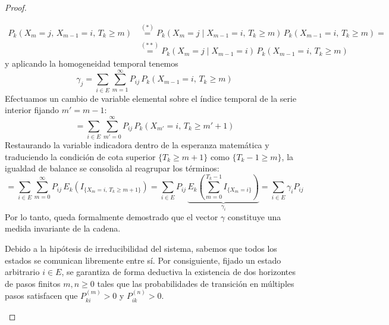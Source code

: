 \begin{teo}
\begin{proof}
\begin{description}
            \begin{align*}
                P_k (X_m = j, \, X_{m-1} = i, \, T_k \geq m) &\overset{(*)}{=} P_k (X_m = j \mid X_{m-1} = i, \, T_k \geq m) \, P_k (X_{m-1} = i, \, T_k \geq m) =\\
                &\overset{(**)}{=} P_k (X_m = j \mid X_{m-1} = i) \, P_k (X_{m-1} = i, \, T_k \geq m)
            \end{align*}
            y aplicando la homogeneidad temporal tenemos
            \[
            \gamma_j=\sum_{i \in E} \sum_{m=1}^{\infty} P_{ij} \, P_k (X_{m-1} = i, \, T_k \geq m)
            \]
            Efectuamos un cambio de variable elemental sobre el índice temporal de la serie interior fijando $m' = m - 1$:
            \[
            = \sum_{i \in E} \sum_{m'=0}^{\infty} P_{ij} \, P_k (X_{m'} = i, \, T_k \geq m' + 1)
            \]
            Restaurando la variable indicadora dentro de la esperanza matemática y traduciendo la condición de cota superior $\{T_k \geq m + 1\}$ como $\{T_k - 1 \geq m\}$, la igualdad de balance se consolida al reagrupar los términos:
            \[
            = \sum_{i \in E} \sum_{m=0}^{\infty} P_{ij} \, E_k \left( I_{\{X_m = i, \, T_k \geq m + 1\}} \right) 
            = \sum_{i \in E} P_{ij} \, \underbrace{E_k \left( \sum_{m=0}^{T_k - 1} I_{\{X_m = i\}} \right)}_{\gamma_i} 
            = \sum_{i \in E} \gamma_i P_{ij}
            \]
            Por lo tanto, queda formalmente demostrado que el vector $\gamma$ constituye una medida invariante de la cadena.
        \item[$(2)$] Debido a la hipótesis de irreducibilidad del sistema, sabemos que todos los estados se comunican libremente entre sí. Por consiguiente, fijado un estado arbitrario $i \in E$, se garantiza de forma deductiva la existencia de dos horizontes de pasos finitos $m, n \geq 0$ tales que las probabilidades de transición en múltiples pasos satisfacen que $P_{ki}^{(m)} > 0$ y $P_{ik}^{(n)} > 0$.


\end{description}
\end{proof}
\end{teo}
